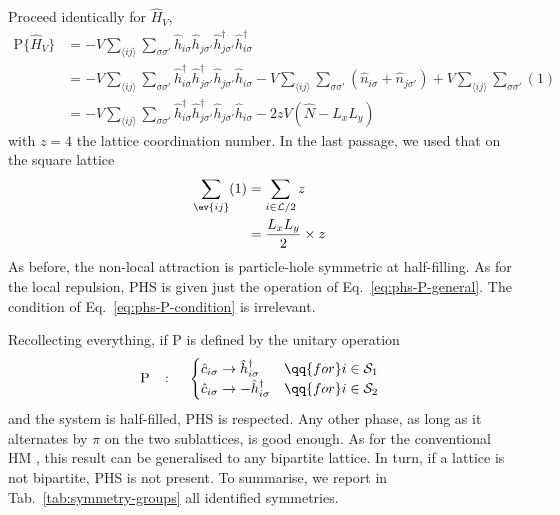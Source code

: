 Proceed identically for $\hat H_V$,
\[
\begin{aligned}
	\mathrm{P} \lbrace \hat H_V \rbrace &= - V \sum_{\langle ij \rangle} \sum_{\sigma \sigma'} \hat h_{i\sigma} \hat h_{j\sigma'} \hat h_{j\sigma'}^\dagger \hat h_{i\sigma}^\dagger \\
	&= - V \sum_{\langle ij \rangle} \sum_{\sigma \sigma'} \hat h_{i\sigma}^\dagger \hat h_{j\sigma'}^\dagger \hat h_{j\sigma'} \hat h_{i\sigma} - V \sum_{\langle ij \rangle} \sum_{\sigma \sigma'} \left(
		\hat n_{i\sigma} + \hat n_{j\sigma'}
	\right) + V \sum_{\langle ij \rangle} \sum_{\sigma \sigma'} (1) \\
	&= - V \sum_{\langle ij \rangle} \sum_{\sigma \sigma'} \hat h_{i\sigma}^\dagger \hat h_{j\sigma'}^\dagger \hat h_{j\sigma'} \hat h_{i\sigma} - 2zV (\hat N - L_x L_y)
\end{aligned}
\]
with $z=4$ the lattice coordination number. In the last passage, we used that on the square lattice
\begin{align}
	\sum_{\ev{ij}} (1) &= \sum_{i\in\mathcal{L}/2} z \nonumber \\
	&= \frac{L_x L_y}{2} \times z \label{eq:square-NN-ghost-sum}
\end{align}
As before, the non-local attraction is particle-hole symmetric at half-filling. As for the local repulsion, PHS is given just the operation of Eq.~\eqref{eq:phs-P-general}. The condition of Eq.~\eqref{eq:phs-P-condition} is irrelevant.

Recollecting everything, if $\mathrm{P}$ is defined by the unitary operation
\[
	\mathrm{P}
	\quad\colon\quad
	\begin{cases}
		\hat c_{i\sigma} \to \hat h_{i\sigma}^\dagger
		&\qq{for}
		i \in \mathcal{S}_1 \\
		\hat c_{i\sigma} \to -\hat h_{i\sigma}^\dagger
		&\qq{for}
		i \in \mathcal{S}_2
	\end{cases}
\]
and the system is half-filled, PHS is respected.
Any other phase, as long as it alternates by $\pi$ on the two sublattices, is good enough. As for the conventional HM \cite{arovas2022hubbard}, this result can be generalised to any bipartite lattice. In turn, if a lattice is not bipartite, PHS is not present. To summarise, we report in Tab.~\ref{tab:symmetry-groups} all identified symmetries.


